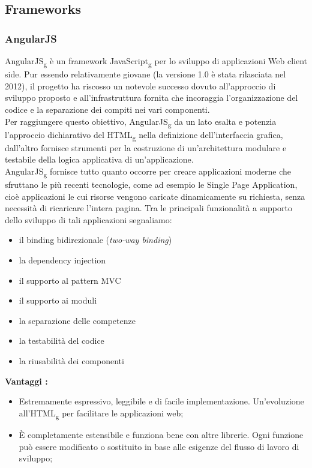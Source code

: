{	\subsection{Frameworks}{
		\subsubsection{AngularJS}{
			{AngularJS}\textsubscript{g} è un framework JavaScript\textsubscript{g} per lo sviluppo di applicazioni Web client side. Pur essendo relativamente giovane (la versione 1.0 è stata rilasciata nel 2012), il progetto ha riscosso un notevole successo dovuto all'approccio di sviluppo proposto e all'infrastruttura fornita che incoraggia l’organizzazione del codice e la separazione dei compiti nei vari componenti.\\
			Per raggiungere questo obiettivo, AngularJS\textsubscript{g} da un lato esalta e potenzia l’approccio dichiarativo del HTML\textsubscript{g} nella definizione dell'interfaccia grafica, dall'altro fornisce strumenti per la costruzione di un’architettura modulare e testabile della logica applicativa di un’applicazione.\\
			AngularJS\textsubscript{g} fornisce tutto quanto occorre per creare applicazioni moderne che sfruttano le più recenti tecnologie, come ad esempio le Single Page Application, cioè applicazioni le cui risorse vengono caricate dinamicamente su richiesta, senza necessità di ricaricare l’intera pagina. Tra le principali funzionalità a supporto dello sviluppo di tali applicazioni segnaliamo:
			\begin{itemize}
				\item il binding bidirezionale (\textit{two-way binding})
				\item la dependency injection
				\item il supporto al pattern MVC
				\item il supporto ai moduli
				\item la separazione delle competenze
				\item la testabilità del codice
				\item la riusabilità dei componenti
			\end{itemize}
			\textbf{Vantaggi :}
			\begin{itemize}\itemsep1pt
				\item Estremamente espressivo, leggibile e di facile implementazione. Un'evoluzione all'HTML\textsubscript{g} per facilitare le applicazioni web;
				\item È completamente estensibile e funziona bene con altre librerie. Ogni funzione può essere modificato o sostituito in base alle esigenze del flusso di lavoro di sviluppo;

\end{itemize}}}}
